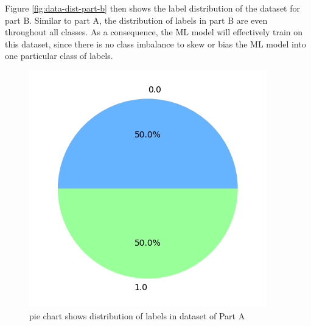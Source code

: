 \documentclass[12pt]{article}
\begin{document}
        Figure \ref{fig:data-dist-part-b} then shows the label distribution of the dataset for part B. Similar to part 
        A, the distribution of labels in part B are even throughout all classes. As a consequence, the ML model will 
        effectively train on this dataset, since there is no class imbalance to skew or bias the ML model into one
        particular class of labels.

        \begin{figure}[h]
            \centering

            \begin{minipage}{.4\linewidth}
                \centering
                \includegraphics[width = \linewidth]{figures/binary-marker}
                \caption{pie chart shows distribution of labels in dataset of Part A}
                \label{fig:data-dist-part-a}
            \end{minipage}%
            \hfill
            \begin{minipage}{.4\linewidth}
                \centering

\end{minipage}
\end{figure}
\end{document}
